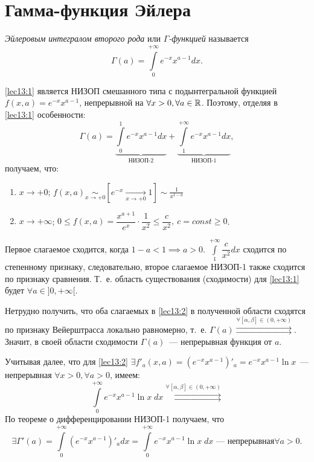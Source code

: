 \documentclass[../../main.tex]{subfiles}
\begin{document}
\section{Гамма-функция Эйлера}

\emph{Эйлеровым интегралом второго рода} или \emph{$\Gamma$-функцией} 
называется
\begin{equation}
\label{lec13:1}
\Gamma(a) = \int\limits_0^{+\infty}e^{-x}x^{a-1}dx.
\end{equation}

\eqref{lec13:1} является НИЗОП смешанного типа с подынтегральной функцией
$f(x, a) = e^{-x}x^{a-1}$, непрерывной на $\forall x > 0, \forall a \in \mathbb{R}$. 
Поэтому, отделяя в \eqref{lec13:1} особенности:
\begin{equation}
	\Gamma(a) = \underbrace{\int\limits_0^1e^{-x}x^{a-1}dx}_{\text{НИЗОП-2}} + 
	\underbrace{\int\limits_1^{+\infty}e^{-x}x^{a-1}dx}_{\text{НИЗОП-1}},
\label{lec13:2} 
\end{equation}
получаем, что:
\begin{enumerate}
\item 
$x \to + 0$; 
$\displaystyle f(x, a) \underset{x \to +0}\sim \left[ e^{-x} 
\underset{x \to +0} \to 1 \right] \sim \frac{1}{x^{1-a}}$
\item
$x \to +\infty$;
$0 \le f(x, a) = \dfrac{x^{a+1}}{e^x} \cdot \dfrac{1}{x^2} \le 
\dfrac{c}{x^2},\ 
c=const \ge 0$.
\end{enumerate}
Первое слагаемое сходится, когда $1 - a < 1 \implies a > 0$.
$\int\limits_1^{+\infty}\dfrac{c}{x^2}dx$ сходится по степенному признаку, 
следовательно, второе слагаемое НИЗОП-1 также сходится по признаку сравнения.
Т.~е. область существования (сходимости) для \eqref{lec13:1} будет $\forall a 
\in ]0, +\infty[$.

Нетрудно получить, что оба слагаемых в \eqref{lec13:2} в полученной области 
сходятся по признаку Вейерштрасса локально равномерно, т.~е.
$\Gamma(a) \overset{\forall \left[ \alpha, \beta \right] \in (0, 
+\infty)}{\rightrightarrows}$.
Значит, в своей области сходимости $\Gamma(a)$~--- непрерывная функция от $a$.

Учитывая далее, что для \eqref{lec13:2}
$\exists f'_a(x, a) = (e^{-x} x^{a-1})'_a = e^{-x}x^{a-1} \ln x$~--- 
непрерывная $\forall x>0,\forall a >0$, имеем:
\[
\int\limits_0^{+\infty} e^{-x} x^{a-1} \ln x\; dx
\overset{\forall \left[ \alpha, \beta \right] \in (0, 
	+\infty)}{\rightrightarrows}
\]
По теореме о дифференцировании НИЗОП-1 получаем, что
\[
\exists \Gamma'(a) = \int\limits_0^{+\infty} (e^{-x} x^{a-1})'_a dx = 
\int\limits_0^{+\infty} e^{-x} x^{a-1} \ln x\; dx 
\text{~--- непрерывная
$\forall a > 0$}.\]
\end{document}

